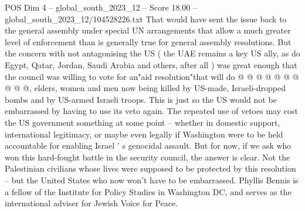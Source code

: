 \begin{textsample}{POS Dim 4 – global\_south\_2023\_12 – Score 18.00 – global\_south\_2023\_12/104528226.txt}
That would have sent the issue back to the general assembly under special UN arrangements that allow a much greater level of enforcement than is generally true for general assembly resolutions.
But the concern with not antagonising the US ( the UAE remains a key US ally, as do Egypt, Qatar, Jordan, Saudi Arabia and others, after all ) was great enough that the council was willing to vote for an"aid resolution"that will do @ @ @ @ @ @ @ @ @ @, elders, women and men now being killed by US-made, Israeli-dropped bombs and by US-armed Israeli troops.
This is just so the US would not be embarrassed by having to use its veto again.
The repeated use of vetoes may cost the US government something at some point -- whether in domestic support, international legitimacy, or maybe even legally if Washington were to be held accountable for enabling Israel ' s genocidal assault.
But for now, if we ask who won this hard-fought battle in the security council, the answer is clear.
Not the Palestinian civilians whose lives were supposed to be protected by this resolution -- but the United States who now won't have to be embarrassed.
Phyllis Bennis is a fellow of the Institute for Policy Studies in Washington DC, and serves as the international adviser for Jewish Voice for Peace.

\end{textsample}
